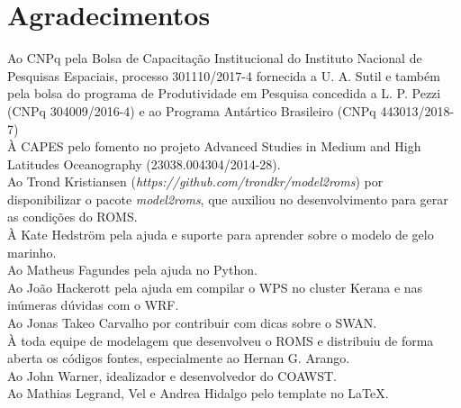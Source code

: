 \chapter*{Agradecimentos}

\bigskip


\noindent Ao CNPq pela Bolsa de Capacitação Institucional do Instituto Nacional de Pesquisas Espaciais, processo 301110/2017-4 
          fornecida a U. A. Sutil e também pela bolsa do programa de Produtividade em Pesquisa concedida a
          L. P. Pezzi (CNPq 304009/2016-4) e ao Programa Antártico Brasileiro (CNPq 443013/2018-7) \\

\noindent À CAPES pelo fomento no projeto Advanced Studies in Medium and High Latitudes Oceanography (23038.004304/2014-28). \\

\noindent Ao Trond Kristiansen (\textcolor{bleu_cite}{\textit{https://github.com/trondkr/model2roms}}) por disponibilizar o 
          pacote \textit{model2roms}, que auxiliou no desenvolvimento para gerar as condições do ROMS. \\

\noindent À Kate Hedström pela ajuda e suporte para aprender sobre o modelo de gelo marinho. \\

\noindent Ao Matheus Fagundes pela ajuda no Python. \\

\noindent Ao João Hackerott pela ajuda em compilar o WPS no cluster Kerana e nas inúmeras dúvidas com o WRF. \\

\noindent Ao Jonas Takeo Carvalho por contribuir com dicas sobre o SWAN. \\

\noindent À toda equipe de modelagem que desenvolveu o ROMS e distribuiu de forma aberta os códigos fontes, 
          especialmente ao Hernan G. Arango.\\

\noindent Ao John Warner, idealizador e desenvolvedor do COAWST. \\

\noindent Ao Mathias Legrand, Vel e Andrea Hidalgo pelo template no \LaTeX.
